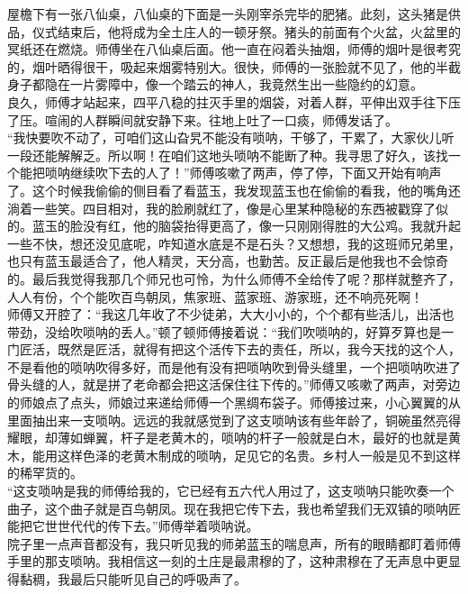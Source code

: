 屋檐下有一张八仙桌，八仙桌的下面是一头刚宰杀完毕的肥猪。此刻，这头猪是供品，仪式结束后，他将成为全土庄人的一顿牙祭。猪头的前面有个火盆，火盆里的冥纸还在燃烧。师傅坐在八仙桌后面。他一直在闷着头抽烟，师傅的烟叶是很考究的，烟叶晒得很干，吸起来烟雾特别大。很快，师傅的一张脸就不见了，他的半截身子都隐在一片雾障中，像一个踏云的神人，我竟然生出一些隐约的幻意。\\

良久，师傅才站起来，四平八稳的拄灭手里的烟袋，对着人群，平伸出双手往下压了压。喧闹的人群瞬间就安静下来。往地上吐了一口痰，师傅发话了。\\

“我快要吹不动了，可咱们这山旮旯不能没有唢呐，干够了，干累了，大家伙儿听一段还能解解乏。所以啊！在咱们这地头唢呐不能断了种。我寻思了好久，该找一个能把唢呐继续吹下去的人了！”师傅咳嗽了两声，停了停，下面又开始有响声了。这个时候我偷偷的侧目看了看蓝玉，我发现蓝玉也在偷偷的看我，他的嘴角还淌着一些笑。四目相对，我的脸刷就红了，像是心里某种隐秘的东西被戳穿了似的。蓝玉的脸没有红，他的脑袋抬得更高了，像一只刚刚得胜的大公鸡。我就升起一些不快，想还没见底呢，咋知道水底是不是石头？又想想，我的这班师兄弟里，也只有蓝玉最适合了，他人精灵，天分高，也勤苦。反正最后是他我也不会惊奇的。最后我觉得我那几个师兄也可怜，为什么师傅不全给传了呢？那样就整齐了，人人有份，个个能吹百鸟朝凤，焦家班、蓝家班、游家班，还不响亮死啊！\\

师傅又开腔了：“我这几年收了不少徒弟，大大小小的，个个都有些活儿，出活也带劲，没给吹唢呐的丢人。”顿了顿师傅接着说：“我们吹唢呐的，好算歹算也是一门匠活，既然是匠活，就得有把这个活传下去的责任，所以，我今天找的这个人，不是看他的唢呐吹得多好，而是他有没有把唢呐吹到骨头缝里，一个把唢呐吹进了骨头缝的人，就是拼了老命都会把这活保住往下传的。”师傅又咳嗽了两声，对旁边的师娘点了点头，师娘过来递给师傅一个黑绸布袋子。师傅接过来，小心翼翼的从里面抽出来一支唢呐。远远的我就感觉到了这支唢呐该有些年龄了，铜碗虽然亮得耀眼，却薄如蝉翼，杆子是老黄木的，唢呐的杆子一般就是白木，最好的也就是黄木，能用这样色泽的老黄木制成的唢呐，足见它的名贵。乡村人一般是见不到这样的稀罕货的。\\

“这支唢呐是我的师傅给我的，它已经有五六代人用过了，这支唢呐只能吹奏一个曲子，这个曲子就是百鸟朝凤。现在我把它传下去，我也希望我们无双镇的唢呐匠能把它世世代代的传下去。”师傅举着唢呐说。\\

院子里一点声音都没有，我只听见我的师弟蓝玉的喘息声，所有的眼睛都盯着师傅手里的那支唢呐。我相信这一刻的土庄是最肃穆的了，这种肃穆在了无声息中更显得黏稠，我最后只能听见自己的呼吸声了。\\

